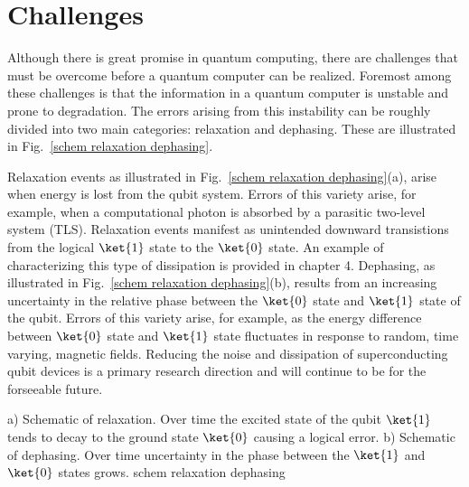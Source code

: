 \section{Challenges}
Although there is great promise in quantum computing, there are challenges that must be overcome before a quantum computer can be realized.
Foremost among these challenges is that the information in a quantum computer is unstable and prone to degradation.
The errors arising from this instability can be roughly divided into two main categories: relaxation and dephasing.
These are illustrated in Fig.~\ref{schem relaxation dephasing}.

Relaxation events as illustrated in Fig.~\ref{schem relaxation dephasing}(a), arise when energy is lost from the qubit system.
Errors of this variety arise, for example, when a computational photon is absorbed by a parasitic two-level system (TLS)\cite{Martinis2005}.
Relaxation events manifest as unintended downward transistions from the logical $\ket{1}$ state to the $\ket{0}$ state.
An example of characterizing this type of dissipation is provided in chapter 4.
Dephasing, as illustrated in Fig.~\ref{schem relaxation dephasing}(b),
results from an increasing uncertainty in the relative phase between the $\ket{0}$ state and $\ket{1}$ state of the qubit.
Errors of this variety arise, for example, as the energy difference between $\ket{0}$ state and $\ket{1}$ state fluctuates in response to random,
time varying, magnetic fields.
Reducing the noise and dissipation of superconducting qubit devices is a primary research direction and will continue to be for the forseeable future.

{
a) Schematic of relaxation.  Over time the excited state of the qubit $\ket{1}$ tends to decay to the ground state $\ket{0}$ causing a logical error.
b) Schematic of dephasing.  Over time uncertainty in the phase between the $\ket{1}$ and $\ket{0}$ states grows.
}
{schem relaxation dephasing}


